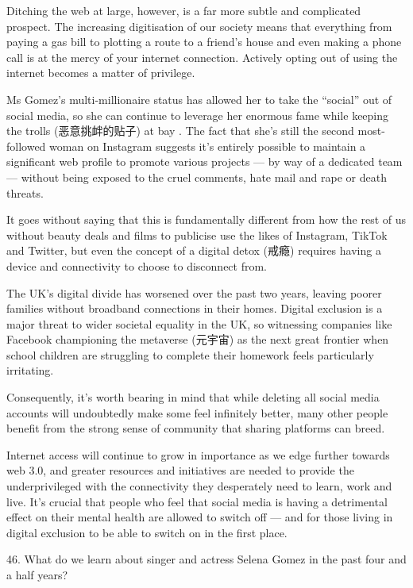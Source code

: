 \documentclass[UTF8,11pt]{ctexart}
\begin{document}
Ditching the web at large, however, is a far more subtle and complicated prospect. The increasing digitisation of our society means that everything from paying a gas bill to plotting a route to a friend’s house and even making a phone call is at the mercy of your internet connection. Actively opting out of using the internet becomes a matter of privilege.


Ms Gomez’s multi-millionaire status has allowed her to take the “social” out of social media, so she can continue to leverage her enormous fame while keeping the trolls (恶意挑衅的贴子) at bay . The fact that she’s still the second most-followed woman on Instagram suggests it’s entirely possible to maintain a significant web profile to promote various projects — by way of a dedicated team — without being exposed to the cruel comments, hate mail and rape or death threats.


It goes without saying that this is fundamentally different from how the rest of us without beauty deals and films to publicise use the likes of Instagram, TikTok and Twitter, but even the concept of a digital detox (戒瘾) requires having a device and connectivity to choose to disconnect from.


The UK’s digital divide has worsened over the past two years, leaving poorer families without broadband connections in their homes. Digital exclusion is a major threat to wider societal equality in the UK, so witnessing companies like Facebook championing the metaverse (元宇宙) as the next great frontier when school children are struggling to complete their homework feels particularly irritating.


Consequently, it’s worth bearing in mind that while deleting all social media accounts will undoubtedly make some feel infinitely better, many other people benefit from the strong sense of community that sharing platforms can breed.


Internet access will continue to grow in importance as we edge further towards web 3.0, and greater resources and initiatives are needed to provide the underprivileged with the connectivity they desperately need to learn, work and live. It’s crucial that people who feel that social media is having a detrimental effect on their mental health are allowed to switch off — and for those living in digital exclusion to be able to switch on in the first place.


46. What do we learn about singer and actress Selena Gomez in the past four and a half years?
\end{document}
